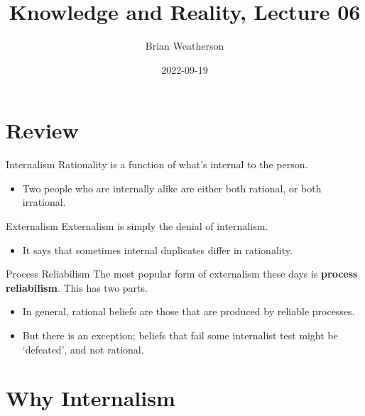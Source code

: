 \documentclass[
  17pt,
  letterpaper,
  ignorenonframetext,
  aspectratio=169,
  handout]{beamer}
\title{Knowledge and Reality, Lecture 06}
\author{Brian Weatherson}
\date{2022-09-19}
\providecommand{\tightlist}{%
  \setlength{\itemsep}{0pt}\setlength{\parskip}{0pt}}\usepackage{longtable,booktabs,array}
\begin{document}
\frame{\titlepage}
\ifdefined\Shaded\renewenvironment{Shaded}{\begin{tcolorbox}[enhanced, borderline west={3pt}{0pt}{shadecolor}, breakable, interior hidden, boxrule=0pt, sharp corners, frame hidden]}{\end{tcolorbox}}\fi

\hypertarget{review}{%
\section{Review}\label{review}}

\begin{frame}{Internalism}
\protect\hypertarget{internalism}{}
Rationality is a function of what's internal to the person.

\begin{itemize}[<+->]
\tightlist
\item
  Two people who are internally alike are either both rational, or both
  irrational.
\end{itemize}
\end{frame}

\begin{frame}{Externalism}
\protect\hypertarget{externalism}{}
Externalism is simply the denial of internalism.

\begin{itemize}[<+->]
\tightlist
\item
  It says that sometimes internal duplicates differ in rationality.
\end{itemize}
\end{frame}

\begin{frame}{Process Reliabilism}
\protect\hypertarget{process-reliabilism}{}
The most popular form of externalism these days is \textbf{process
reliabilism}. This has two parts.

\begin{itemize}[<+->]
\tightlist
\item
  In general, rational beliefs are those that are produced by reliable
  processes.
\item
  But there is an exception; beliefs that fail some internalist test
  might be `defeated', and not rational.
\end{itemize}
\end{frame}

\hypertarget{why-internalism}{%
\section{Why Internalism}\label{why-internalism}}
\end{document}
